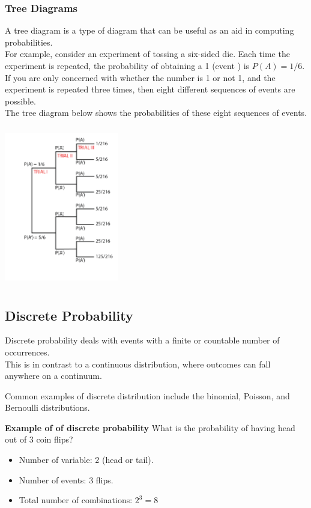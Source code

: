 \documentclass{article}
\begin{document}
\subsubsection{Tree Diagrams}
A tree diagram is a type of diagram that can be useful as an aid in computing probabilities. \\ 
For example, consider an experiment of tossing a six-sided die. Each
time the experiment is repeated, the probability of obtaining a 1 (event ) is $P(A) = 1 / 6$. 
If you are only concerned with whether the number is 1 or not 1, and the experiment is repeated three times, then eight different sequences of events are possible. \\ 
The tree diagram below shows the probabilities of these eight sequences of events.

\includegraphics[width=5cm, height=7cm]{tree_diagram}

\subsection{Discrete Probability}
Discrete probability deals with events with a finite or countable number of occurrences. \\ 
This is in contrast to a continuous distribution, where outcomes can fall anywhere on a continuum. 

Common examples of discrete distribution include the binomial, Poisson, and Bernoulli distributions.

\textbf{Example of of discrete probability}
What is the probability of having head out of 3 coin flips?
\begin{itemize}
    \item Number of variable: 2 (head or tail).
    \item Number of events: 3 flips.
    \item Total number of combinations: $2^3 = 8$
\end{itemize}
\end{document}
